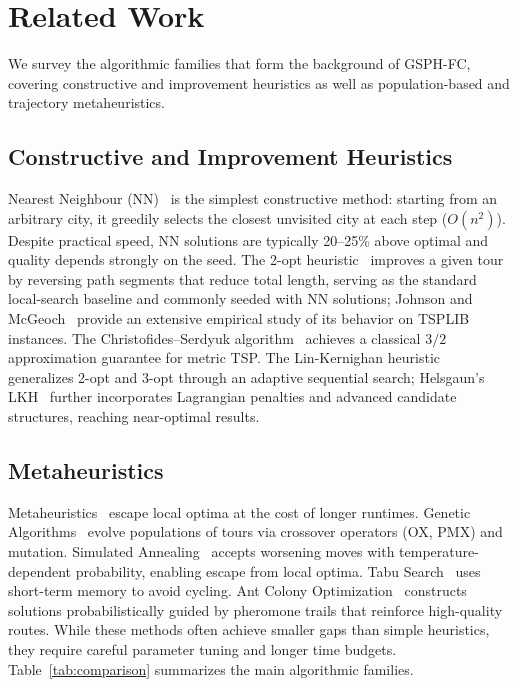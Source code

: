 \documentclass[runningheads]{llncs}
\begin{document}
\section{Related Work}
\label{sec:related}

We survey the algorithmic families that form the background of GSPH-FC,
covering constructive and improvement heuristics as well as
population-based and trajectory metaheuristics.

\subsection{Constructive and Improvement Heuristics}

Nearest Neighbour (NN)~\cite{kizilatecs2013nearest} is the simplest
constructive method: starting from an arbitrary city, it greedily
selects the closest unvisited city at each step ($O(n^2)$). Despite
practical speed, NN solutions are typically 20--25\% above optimal
and quality depends strongly on the seed. The 2-opt
heuristic~\cite{croes1958method} improves a given tour by reversing
path segments that reduce total length, serving as the standard
local-search baseline and commonly seeded with NN solutions;
Johnson and McGeoch~\cite{johnson1997tsp} provide an extensive
empirical study of its behavior on TSPLIB instances.
The Christofides--Serdyuk algorithm~\cite{christofides1976worst}
achieves a classical $3/2$ approximation guarantee for metric TSP.
The Lin-Kernighan heuristic~\cite{lin1973effective} generalizes
2-opt and 3-opt through an adaptive sequential search; Helsgaun's
LKH~\cite{helsgaun2000effective,helsgaun2017extension} further
incorporates Lagrangian penalties and advanced candidate structures,
reaching near-optimal results.

\subsection{Metaheuristics}

Metaheuristics~\cite{blum2003metaheuristics,sorensen2015metaheuristics}
escape local optima at the cost of longer runtimes. Genetic
Algorithms~\cite{GENETICS,goldberg1985alleleslociand} evolve
populations of tours via crossover operators (OX, PMX) and mutation.
Simulated Annealing~\cite{kirkpatrick1983optimization} accepts
worsening moves with temperature-dependent probability, enabling
escape from local optima. Tabu Search~\cite{glover1989tabu} uses
short-term memory to avoid cycling. Ant Colony
Optimization~\cite{dorigo1992optimization,dorigo1996ant} constructs
solutions probabilistically guided by pheromone trails that
reinforce high-quality routes. While these methods often achieve
smaller gaps than simple heuristics, they require careful parameter
tuning and longer time budgets. Table~\ref{tab:comparison}
summarizes the main algorithmic families.
\end{document}
